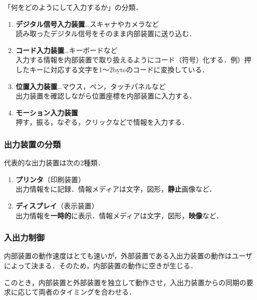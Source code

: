 「何をどのようにして入力するか」の分類．

\begin{enumerate}[label=\textbf{(\alph*)}, labelsep=10pt, leftmargin=23pt]
	\item \textbf{デジタル信号入力装置}…スキャナやカメラなど\\
	読み取ったデジタル信号をそのまま内部装置に送り込む．
	\item \textbf{コード入力装置}…キーボードなど\\
	入力する情報を内部装置で取り扱えるようにコード（符号）化する．例）押したキーに対応する文字を1～2byteのコードに変換している．
	\item \textbf{位置入力装置}…マウス，ペン，タッチパネルなど\\
	出力装置を確認しながら位置座標を内部装置に入力する．
	\item \textbf{モーション入力装置}\\
	押す，振る，なぞる，クリックなどで情報を入力する．
\end{enumerate}



\subsubsection{出力装置の分類}\label{sec:com_arch-3-B-4}

代表的な出力装置は次の2種類．

\begin{enumerate}[label=\textbf{(\alph*)}, labelsep=10pt, leftmargin=23pt]
	\item \textbf{プリンタ}（印刷装置）\\
	出力情報をに記録．情報メディアは文字，図形，\textbf{静止}画像など．
	\item \textbf{ディスプレイ}（表示装置）\\
	出力情報を\textbf{一時的}に表示．情報メディアは文字，図形，\textbf{映像}など．
\end{enumerate}



\subsubsection{入出力制御}\label{sec:com_arch-3-B-5}

内部装置の動作速度はとても速いが，外部装置である入出力装置の動作はユーザによって決まる．そのため，内部装置の動作に空きが生じる．

このとき，内部装置と外部装置を独立して動作させ，入出力装置からの同期の要求に応じて両者のタイミングを合わせる．



